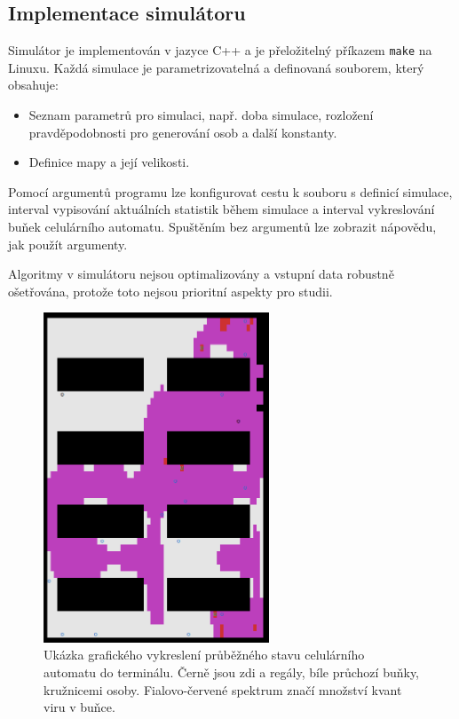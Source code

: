 \documentclass[11pt,a4paper]{article}
\begin{document}
\subsection{Implementace simulátoru}
Simulátor je implementován v jazyce C++ a je přeložitelný příkazem \verb|make| na Linuxu. Každá simulace je parametrizovatelná a definovaná souborem, který obsahuje:
\begin{itemize}
    \item Seznam parametrů pro simulaci, např. doba simulace, rozložení pravděpodobnosti pro generování osob a další konstanty.
    \item Definice mapy a její velikosti. 
\end{itemize}

Pomocí argumentů programu lze konfigurovat cestu k souboru s definicí simulace, interval vypisování aktuálních statistik během simulace a interval vykreslování buňek celulárního automatu. Spuštěním bez argumentů lze zobrazit nápovědu, jak použít argumenty.

Algoritmy v simulátoru nejsou optimalizovány a vstupní data robustně ošetřována, protože toto nejsou prioritní aspekty pro studii. 

\begin{figure}[h!]
    \caption{Ukázka grafického vykreslení průběžného stavu celulárního automatu do terminálu. Černě jsou zdi a regály, bíle průchozí buňky, kružnicemi osoby. Fialovo-červené spektrum značí množství kvant viru v buňce.}
    \label{fig:render}
    \begin{center}
      \includegraphics[width=0.6\textwidth]{graphics.png}
      \end{center}
\end{figure}    
\end{document}
